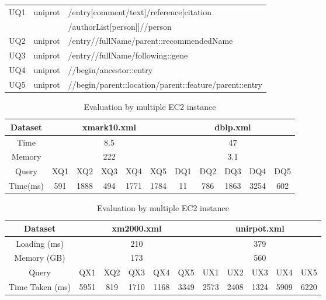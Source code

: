 \begin{table}
\begin{tabular}{c|c|l}
		\hline
		UQ1 & uniprot & /entry[comment/text]/reference[citation \\
		&&/authorList[person]]//person\\
		\hline
		UQ2 & uniprot & /entry//fullName/parent::recommendedName \\
		\hline
		UQ3 & uniprot & /entry//fullName/following::gene \\
		\hline
		UQ4 & uniprot & //begin/ancestor::entry\\
		\hline
		UQ5 & uniprot & //begin/parent::location/parent::feature/parent::entry \\
		\hline
	\end{tabular}
\end{table}


\begin{table}[t]
	\centering
	\caption{Evaluation by one EC2 instance}
	\label{tab:singeval}
	\begin{tabular}{c|c|c|c|c|c|c|c|c|c|c}
		\hline \hline
		Dataset  & \multicolumn{5}{c|}{xmark10.xml} & \multicolumn{5}{c}{dblp.xml} \\ \hline
		Time     & \multicolumn{5}{c|}{8.5}          & \multicolumn{5}{c}{47}       \\ \hline
		Memory   & \multicolumn{5}{c|}{222}          & \multicolumn{5}{c}{3.1}       \\ \hline
		Query    & XQ1  & XQ2   & XQ3 & XQ4  & XQ5  & DQ1 & DQ2 & DQ3  & DQ4  & DQ5 \\ \hline
		Time(ms) & 591  & 1888  & 494 & 1771 & 1784 & 11  & 786 & 1863 & 3254 & 602 \\ \hline
	\end{tabular}
    \vspace{10px}
	\caption{Evaluation by multiple EC2 instance}
	\centering
	\label{tab:multieval}
	\begin{tabular}{c|c|c|c|c|c|c|c|c|c|c}
		\hline \hline
		Dataset	&	\multicolumn{5}{|c|}{xm2000.xml}     & \multicolumn{5}{c}{unirpot.xml}       \\
		\hline
		Loading (ms)	&	\multicolumn{5}{|c|}{210}     & \multicolumn{5}{c}{379}       \\
		\hline
		Memory (GB)	&	\multicolumn{5}{|c|}{173}     & \multicolumn{5}{c}{560}       \\
		\hline
		Query	& QX1      & XQ2     & QX3      & QX4      & QX5      & UX1      & UX2      & UX3      & UX4      & UX5      \\
		\hline
		Time Taken (ms) & 5951 & 819 & 1710 & 1168 & 3349 & 2573 & 2408 & 1324 & 5909 & 6220\\
		\hline
	\end{tabular}
\end{table}



